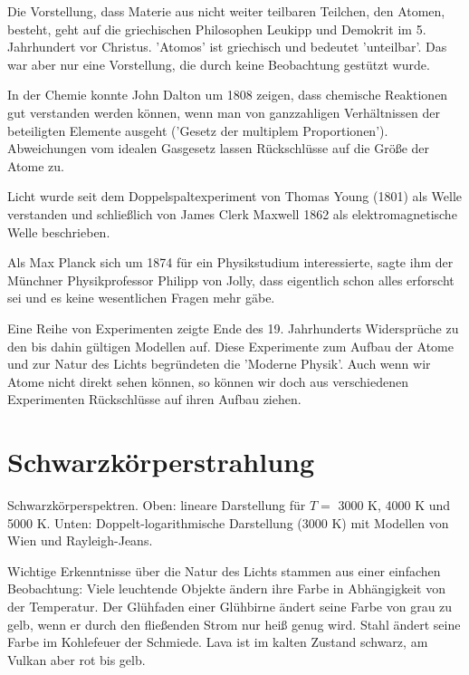 Die Vorstellung, dass Materie aus nicht weiter teilbaren Teilchen, den Atomen, besteht, geht auf die griechischen Philosophen Leukipp und Demokrit im 5. Jahrhundert vor Christus. 'Atomos' ist griechisch und bedeutet 'unteilbar'. Das war aber nur eine Vorstellung, die durch keine Beobachtung gestützt wurde.

In der Chemie konnte John Dalton um 1808 zeigen, dass chemische Reaktionen gut verstanden werden können, wenn man von ganzzahligen Verhältnissen der beteiligten Elemente ausgeht ('Gesetz der multiplem Proportionen'). Abweichungen vom idealen Gasgesetz lassen Rückschlüsse auf die Größe der Atome zu.

Licht wurde seit dem Doppelspaltexperiment von Thomas Young (1801) als Welle verstanden und schließlich von  James Clerk Maxwell 1862 als elektromagnetische Welle beschrieben.

Als Max Planck sich um 1874 für ein Physikstudium interessierte, sagte ihm der Münchner Physikprofessor Philipp von Jolly, dass eigentlich schon alles erforscht sei und es keine wesentlichen Fragen mehr gäbe.

Eine Reihe von Experimenten zeigte Ende des 19. Jahrhunderts Widersprüche zu den bis dahin gültigen Modellen auf. Diese Experimente zum Aufbau der Atome und zur Natur des Lichts begründeten die 'Moderne Physik'. Auch wenn wir Atome nicht direkt sehen können, so können wir doch aus verschiedenen Experimenten Rückschlüsse auf ihren Aufbau ziehen.

\section{Schwarzkörperstrahlung}

\begin{marginfigure}
    \caption{Schwarzkörperspektren. Oben: lineare Darstellung für $T=$ 3000 K, 4000 K und 5000 K. Unten: Doppelt-logarithmische Darstellung (3000 K) mit Modellen von Wien und Rayleigh-Jeans.}
    \label{fig:1_planck_linlog}
\end{marginfigure}


Wichtige Erkenntnisse über die Natur des Lichts stammen aus einer einfachen Beobachtung: Viele leuchtende Objekte ändern ihre Farbe in Abhängigkeit von der Temperatur. Der Glühfaden einer Glühbirne ändert seine Farbe von grau zu gelb, wenn er durch den fließenden Strom nur heiß genug wird. Stahl ändert seine Farbe im Kohlefeuer der Schmiede. Lava ist im kalten Zustand schwarz, am Vulkan aber rot bis gelb.

